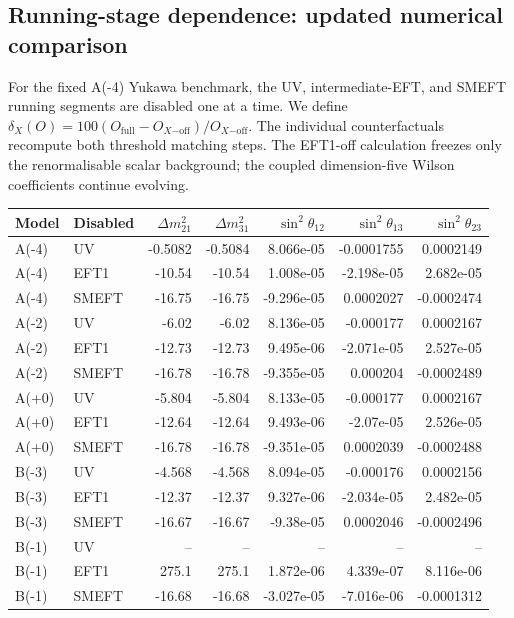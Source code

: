 \subsection*{Running-stage dependence: updated numerical comparison}
For the fixed A(-4) Yukawa benchmark, the
UV, intermediate-EFT, and SMEFT running segments are disabled one at a time.
We define $\delta_X(O)=100(O_{\mathrm{full}}-O_{X\mathrm{-off}})/O_{X\mathrm{-off}}$.
The individual counterfactuals recompute both threshold matching steps.
The EFT1-off calculation freezes only the renormalisable scalar background;
the coupled dimension-five Wilson coefficients continue evolving.
\begin{table}[htbp]
\centering
\scriptsize
\begin{tabular}{llrrrrr}
\hline
Model & Disabled & $\Delta m^2_{21}$ & $\Delta m^2_{31}$ & $\sin^2\theta_{12}$ & $\sin^2\theta_{13}$ & $\sin^2\theta_{23}$ \\
\hline
A(-4) & UV & -0.5082 & -0.5084 & 8.066e-05 & -0.0001755 & 0.0002149 \\
A(-4) & EFT1 & -10.54 & -10.54 & 1.008e-05 & -2.198e-05 & 2.682e-05 \\
A(-4) & SMEFT & -16.75 & -16.75 & -9.296e-05 & 0.0002027 & -0.0002474 \\
A(-2) & UV & -6.02 & -6.02 & 8.136e-05 & -0.000177 & 0.0002167 \\
A(-2) & EFT1 & -12.73 & -12.73 & 9.495e-06 & -2.071e-05 & 2.527e-05 \\
A(-2) & SMEFT & -16.78 & -16.78 & -9.355e-05 & 0.000204 & -0.0002489 \\
A(+0) & UV & -5.804 & -5.804 & 8.133e-05 & -0.000177 & 0.0002167 \\
A(+0) & EFT1 & -12.64 & -12.64 & 9.493e-06 & -2.07e-05 & 2.526e-05 \\
A(+0) & SMEFT & -16.78 & -16.78 & -9.351e-05 & 0.0002039 & -0.0002488 \\
B(-3) & UV & -4.568 & -4.568 & 8.094e-05 & -0.000176 & 0.0002156 \\
B(-3) & EFT1 & -12.37 & -12.37 & 9.327e-06 & -2.034e-05 & 2.482e-05 \\
B(-3) & SMEFT & -16.67 & -16.67 & -9.38e-05 & 0.0002046 & -0.0002496 \\
B(-1) & UV & -- & -- & -- & -- & -- \\
B(-1) & EFT1 & 275.1 & 275.1 & 1.872e-06 & 4.339e-07 & 8.116e-06 \\
B(-1) & SMEFT & -16.68 & -16.68 & -3.027e-05 & -7.016e-06 & -0.0001312 \\

\end{tabular}
\end{table}
